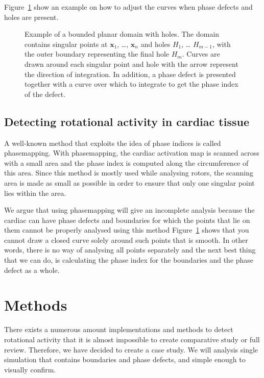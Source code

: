 \documentclass[twocolumn]{article}
\begin{document}
Figure~\ref{fig:index_calculation} show an example on how to adjust the curves
when phase defects and holes are present.

\begin{figure}
\centering
{}
\caption{Example of a bounded planar domain with holes. The domain
contains singular points at \(\pmb{x}_1\), \ldots, \(\pmb{x}_n\) and
holes \(H_1\), \ldots{} \(H_{m-1}\), with the outer boundary
representing the final hole \(H_m\). Curves are drawn around each
singular point and hole with the arrow represent the direction of
integration. In addition, a phase defect is presented together with a
curve over which to integrate to get the phase index of the defect.}
\label{fig:index_calculation}
\end{figure}

\subsection{Detecting rotational activity in cardiac tissue}\label{detecting-rotational-activity-in-cardiac-tissue}

A well-known method that exploits the idea of phase indices is called
phasemapping. With phasemapping, the cardiac activation map is scanned
across with a small area and the phase index is computed along the
circumference of this area. Since this method is mostly used while
analysing rotors, the scanning area is made as small as possible in
order to ensure that only one singular point lies within the area.

We argue that using phasemapping will give an incomplete analysis
because the cardiac can have phase defects and boundaries for which the
points that lie on them cannot be properly analysed using this method
Figure~\ref{fig:index_calculation} shows that you cannot draw a closed curve solely around
such points that is smooth. In other words, there is no way of analysing
all points separately and the next best thing that we can do, is
calculating the phase index for the boundaries and the phase defect as a
whole.

\section{Methods}\label{methods}

There exists a numerous amount implementations and methods to detect
rotational activity \autocite{pikunov2023the, gurevich2019robust, li2020standardizing}
that it is almost impossible to create
comparative study or full review. Therefore, we have decided to create a
case study. We will analysis single simulation that contains boundaries
and phase defects, and simple enough to visually confirm.
\end{document}
